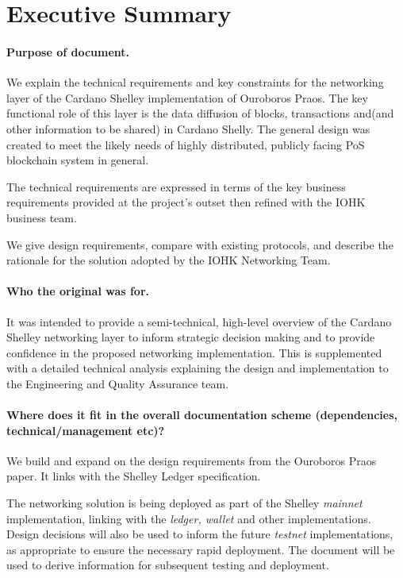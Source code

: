 \documentclass[11pt,a4paper]{article}
\begin{document}
\section{Executive Summary}
\label{executive-summary}

\paragraph{Purpose of document.}

We explain the technical requirements and key constraints for the
networking layer of the Cardano Shelley implementation of Ouroboros
Praos. The key functional role of this layer is the data diffusion of
blocks, transactions and(and other information to be shared) in Cardano
Shelly. The general design was created to meet the likely needs of
highly distributed, publicly facing PoS blockchain system in general.

The technical requirements are expressed in terms of the key business
requirements provided at the project's outset then refined with the IOHK
business team.

We give design requirements, compare with existing protocols, and
describe the rationale for the solution adopted by the IOHK Networking
Team.

\paragraph{Who the original was for.}
It was intended to provide a semi-technical, high-level overview of the Cardano
Shelley networking layer to inform strategic decision making and to
provide confidence in the proposed networking implementation.
This is supplemented with a detailed technical analysis explaining the
design and implementation to the Engineering and Quality Assurance team.

\paragraph{Where does it fit in the overall documentation scheme
(dependencies, technical/management etc)?}

We build and expand on the design requirements from the Ouroboros Praos
paper. It links with the Shelley Ledger specification.

The networking solution is being deployed as part of the Shelley
\emph{mainnet} implementation, linking with the \emph{ledger, wallet}
and other implementations. Design decisions will also be used to inform
the future \emph{testnet} implementations, as appropriate to ensure the
necessary rapid deployment. The document will be used to derive
information for subsequent testing and deployment.
\end{document}
